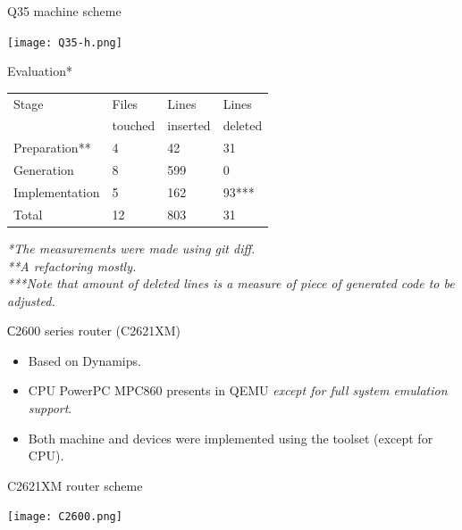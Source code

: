 \documentclass[unicode,hyperref={unicode=true},aspectratio=169]{beamer}
\begin{document}
\begin{frame}{Q35 machine scheme}
\begin{center}
\texttt{[image: Q35-h.png]}
\end{center}
\end{frame}



\begin{frame}{Evaluation*}
\begin{center}
\begin{tabular}{l|lll}
Stage          & Files     & Lines     & Lines   \\
               & touched   & inserted  & deleted \\
\hline
Preparation**  & 4         & 42        & 31      \\
Generation     & 8         & 599       & 0       \\
Implementation & 5         & 162       & 93***   \\
Total          & 12        & 803       & 31      \\
\end{tabular}
\end{center}
\vfill
\it{*The measurements were made using git diff.} \\
\it{**A refactoring mostly.}\\
\it{***Note that amount of deleted lines is a measure of piece of generated
code to be adjusted.}\\
\end{frame}



\begin{frame}{С2600 series router (C2621XM)}
\begin{itemize}
\item Based on Dynamips.
\item CPU PowerPC MPC860 presents in QEMU \textit{except for full system
emulation support}.
\item Both machine and devices were implemented using the toolset (except for
CPU).
\end{itemize}
\end{frame}



\begin{frame}{C2621XM router scheme}
\begin{center}
\texttt{[image: C2600.png]}
\end{center}
\end{frame}
\end{document}
